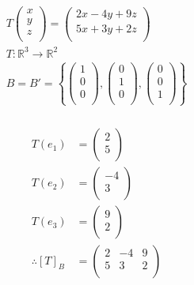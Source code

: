 \documentclass[fleqn, a4paper]{amsart}
\theoremstyle{definition}
\theoremstyle{theorem}
\theoremstyle{remark}
\numberwithin{corollary}{theorem}
\numberwithin{equation}{theorem}
\begin{document}
\begin{multicols}{1}
\begin{gather*}
	T 
		\begin{pmatrix}
			x\\
			y\\
			z\\
		\end{pmatrix}
	=
		\begin{pmatrix}
			2x - 4y + 9z\\
			5x + 3y + 2z\\
		\end{pmatrix}\\
	T : \mathbb{R}^3 \to \mathbb{R}^2\\
	B = B' = 
		\left\lbrace
			\begin{pmatrix}
				1\\
				0\\
				0\\
			\end{pmatrix}
			,
			\begin{pmatrix}
				0\\
				1\\
				0\\
			\end{pmatrix}
			,
			\begin{pmatrix}
				0\\
				0\\
				1\\
			\end{pmatrix}
		\right\rbrace
\end{gather*}

\subsubsection{}

\begin{align*}
	T(e_1) &=
		\begin{pmatrix}
			2\\
			5\\
		\end{pmatrix}\\
	T(e_2) &=
		\begin{pmatrix}
			-4\\
			3\\
		\end{pmatrix}\\
	T(e_3) &=
		\begin{pmatrix}
			9\\
			2\\
		\end{pmatrix}\\
	\therefore [T]_B &= 
		\begin{pmatrix}
			2 & -4 & 9\\
			5 & 3 & 2\\
		\end{pmatrix}
\end{align*}


\end{multicols}
\end{document}

